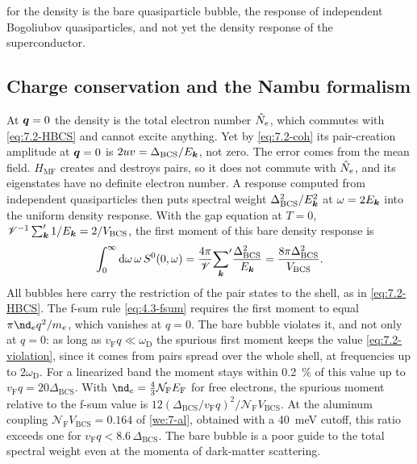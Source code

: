  for the density is the bare quasiparticle bubble, the response of independent Bogoliubov quasiparticles, and not yet the density response of the superconductor.

\subsection{Charge conservation and the Nambu formalism}

At $\bm{q} = 0$ the density is the total electron number $\hat{N}_e$, which commutes with \cref{eq:7.2-HBCS} and cannot excite anything. Yet by \cref{eq:7.2-coh} its pair-creation amplitude at $\bm{q} = 0$ is $2uv = \Delta_{\mathrm{BCS}}/E_{\bm{k}}$, not zero. The error comes from the mean field. $H_{\mathrm{MF}}$ creates and destroys pairs, so it does not commute with $\hat{N}_e$, and its eigenstates have no definite electron number. A response computed from independent quasiparticles then puts spectral weight $\Delta_{\mathrm{BCS}}^2/E_{\bm{k}}^2$ at $\omega = 2E_{\bm{k}}$ into the uniform density response. With the gap equation at $T = 0$, $\mathscr{V}^{-1}\sum'_{\bm{k}}1/E_{\bm{k}} = 2/V_{\mathrm{BCS}}$, the first moment of this bare density response is
\begin{equation}
  \int_0^\infty\mathrm{d}\omega\,\omega\,S^0(0,\omega) = \frac{4\pi}{\mathscr{V}}{\sum_{\bm{k}}}'\frac{\Delta_{\mathrm{BCS}}^2}{E_{\bm{k}}} = \frac{8\pi\Delta_{\mathrm{BCS}}^2}{V_{\mathrm{BCS}}} .
  \label{eq:7.2-violation}
\end{equation}
All bubbles here carry the restriction of the pair states to the shell, as in \cref{eq:7.2-HBCS}. The f-sum rule \cref{eq:4.3-fsum} requires the first moment to equal $\pi\nd_eq^2/m_e$, which vanishes at $q = 0$. The bare bubble violates it, and not only at $q = 0$: as long as $v_{\mathrm{F}}q \ll \omega_{\mathrm{D}}$ the spurious first moment keeps the value \cref{eq:7.2-violation}, since it comes from pairs spread over the whole shell, at frequencies up to $2\omega_{\mathrm{D}}$. For a linearized band the moment stays within \SI{0.2}{\percent} of this value up to $v_{\mathrm{F}}q = 20\Delta_{\mathrm{BCS}}$. With $\nd_e = \frac43\mathcal{N}_{\mathrm{F}}E_{\mathrm{F}}$ for free electrons, the spurious moment relative to the f-sum value is $12(\Delta_{\mathrm{BCS}}/v_{\mathrm{F}}q)^2/\mathcal{N}_{\mathrm{F}}V_{\mathrm{BCS}}$. At the aluminum coupling $\mathcal{N}_{\mathrm{F}}V_{\mathrm{BCS}} = 0.164$ of \cref{we:7-al}, obtained with a \SI{40}{meV} cutoff, this ratio exceeds one for $v_{\mathrm{F}}q < 8.6\,\Delta_{\mathrm{BCS}}$. The bare bubble is a poor guide to the total spectral weight even at the momenta of dark-matter scattering.

